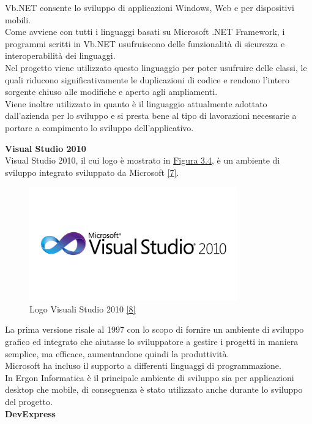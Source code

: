 Vb.NET consente lo sviluppo di applicazioni Windows, Web e per dispositivi mobili. \\
Come avviene con tutti i linguaggi basati su Microsoft .NET Framework,
i programmi scritti in Vb.NET usufruiscono delle funzionalità di sicurezza e interoperabilità dei linguaggi.\\
Nel progetto viene utilizzato questo linguaggio per poter usufruire delle classi, le quali riducono significativamente le duplicazioni di codice e rendono l'intero sorgente 
chiuso alle modifiche e aperto agli ampliamenti. \\Viene inoltre utilizzato in quanto è il linguaggio attualmente adottato dall'azienda per lo sviluppo e si presta bene
al tipo di lavorazioni necessarie a portare a compimento lo sviluppo dell'applicativo.

\newpage
\textbf{Visual Studio 2010}\\
Visual Studio 2010, il cui logo è mostrato in \hyperref[vs-2010]{Figura 3.4}, è un ambiente di sviluppo integrato sviluppato da Microsoft \hyperref[vs]{[7]}. 
\begin{figure}[H]
	\includegraphics[width=9cm]{immagini/microsoft-visual-studio-2010-logo.png}
	\centering
	\caption{Logo Visuali Studio 2010 \hyperref[vs-logo]{[8]}}
	\label{vs-2010}
\end{figure}


La prima versione risale al 1997 con lo scopo di fornire
un ambiente di sviluppo grafico ed integrato che aiutasse lo sviluppatore a gestire i progetti in maniera semplice, ma efficace, aumentandone quindi la produttività.\\
Microsoft ha incluso il supporto a differenti linguaggi di programmazione.\\
In Ergon Informatica è il principale ambiente di sviluppo sia per applicazioni desktop che mobile, di conseguenza è stato utilizzato anche durante lo sviluppo del progetto.\\

\textbf{DevExpress}\\

